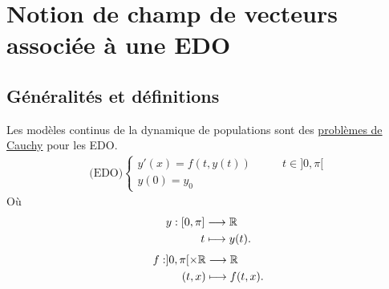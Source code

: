 
\section{Notion de champ de vecteurs associée à une EDO}
\subsection{Généralités et définitions}
Les modèles continus de la dynamique de populations sont des \underline{problèmes de Cauchy} pour les EDO.
\begin{align*}
    \text{(EDO)} \begin{cases}
        y'(x) = f(t, y(t)) &\qquad t \in ]0, \pi[ \\
        y(0) = y_0  
    \end{cases}
\end{align*}
Où \begin{align*}
    y: [0, \pi] &\longrightarrow \mathbb{R} \\
    t &\longmapsto y(t) 
.\end{align*}
\begin{align*}
    f: ]0, \pi[ \times \mathbb{R} &\longrightarrow\mathbb{R}\\
    (t, x) &\longmapsto f(t, x) 
.\end{align*}

